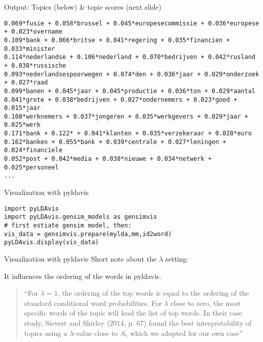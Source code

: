 \begin{frame}[fragile]{Output: Topics (below) \& topic scores (next slide)}
\begin{lstlisting}
0.069*fusie + 0.058*brussel + 0.045*europesecommissie + 0.036*europese + 0.023*overname
0.109*bank + 0.066*britse + 0.041*regering + 0.035*financien + 0.033*minister
0.114*nederlandse + 0.106*nederland + 0.070*bedrijven + 0.042*rusland + 0.038*russische
0.093*nederlandsespoorwegen + 0.074*den + 0.036*jaar + 0.029*onderzoek + 0.027*raad
0.099*banen + 0.045*jaar + 0.045*productie + 0.036*ton + 0.029*aantal
0.041*grote + 0.038*bedrijven + 0.027*ondernemers + 0.023*goed + 0.015*jaar
0.108*werknemers + 0.037*jongeren + 0.035*werkgevers + 0.029*jaar + 0.025*werk
0.171*bank + 0.122* + 0.041*klanten + 0.035*verzekeraar + 0.028*euro
0.162*banken + 0.055*bank + 0.039*centrale + 0.027*leningen + 0.024*financiele
0.052*post + 0.042*media + 0.038*nieuwe + 0.034*netwerk + 0.025*personeel
...
\end{lstlisting}
\end{frame}


\begin{frame}[plain]
\end{frame}




\begin{frame}[fragile]{Visualization with pyldavis}
\begin{lstlisting}
import pyLDAvis
import pyLDAvis.gensim_models as gensimvis
# first estiate gensim model, then:
vis_data = gensimvis.prepare(mylda,mm,id2word)
pyLDAvis.display(vis_data)
\end{lstlisting}
\end{frame}

\begin{frame}{Visualization with pyldavis}
Short note about the $\lambda$ setting:

It influences the ordering of the words in pyldavis.

\begin{quote}
``For $\lambda = 1$, the ordering of the top words is equal to the ordering of the standard conditional word probabilities. For $\lambda$ close to zero, the most specific words of the topic will lead the list of top words. In their case study, Sievert and Shirley (2014, p. 67) found the best interpretability of topics using a  $\lambda$-value close to .6, which we adopted for our own case'' \parencite[p.~107]{Maier2018a}
\end{quote}

\end{frame}




